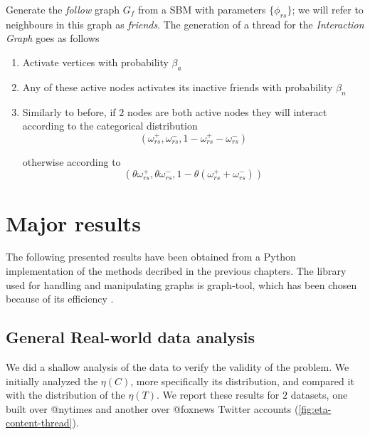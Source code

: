 \bigskip
Generate the \emph{follow} graph $G_{f}$ from a SBM with parameters $\{ \phi
	_{rs}  \}$; we will refer to neighbours in this graph as \emph{friends}.
The generation of a thread for the \emph{Interaction Graph} goes as follows

\begin{enumerate}
	\item Activate vertices with probability $\beta_{a}  $
	\item Any of these active nodes activates its inactive friends with
	      probability $\beta_n$
	\item Similarly to before, if $2$ nodes are both active nodes they will interact according to the categorical distribution
	      \begin{equation*}
		      (\omega _{rs}
		      ^{+}, \omega _{rs} ^{-}, 1 - \omega _{rs} ^{+} - \omega _{rs} ^{-})
	      \end{equation*}

	      otherwise according to
	      \begin{equation*}
		      (\theta \omega _{rs} ^{+}, \theta \omega _{rs} ^{-}, 1
		      - \theta (\omega _{rs} ^{+} + \omega _{rs} ^{-}))
	      \end{equation*}
\end{enumerate}

\section{Major results}

The following presented results have been obtained from a Python
implementation of the methods decribed in the previous chapters. The library used
for handling and manipulating graphs is graph-tool, which has been chosen
because of its efficiency \cite{peixoto_graph-tool_2014}.

\subsection{General Real-world data analysis}%
\label{sub:validity_problem_definition}

We did a shallow analysis of the data to verify the validity of the problem. We
initially analyzed the $\eta(C)$, more specifically its distribution, and
compared it with the distribution of the $\eta(T)$. We report these results for
$2$ datasets, one built over @nytimes and another over @foxnews Twitter
accounts \footnotemark (\autoref{fig:eta-content-thread}).

